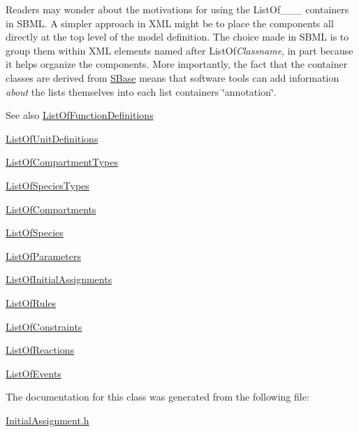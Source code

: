 Readers may wonder about the motivations for using the List\+Of\+\_\+\+\_\+\+\_\+ containers in S\+B\+ML. A simpler approach in X\+ML might be to place the components all directly at the top level of the model definition. The choice made in S\+B\+ML is to group them within X\+ML elements named after List\+Of{\itshape Classname}, in part because it helps organize the components. More importantly, the fact that the container classes are derived from \hyperlink{class_s_base}{S\+Base} means that software tools can add information {\itshape about} the lists themselves into each list container\textquotesingle{}s \char`\"{}annotation\char`\"{}.

\begin{DoxySeeAlso}{See also}
\hyperlink{class_list_of_function_definitions}{List\+Of\+Function\+Definitions} 

\hyperlink{class_list_of_unit_definitions}{List\+Of\+Unit\+Definitions} 

\hyperlink{class_list_of_compartment_types}{List\+Of\+Compartment\+Types} 

\hyperlink{class_list_of_species_types}{List\+Of\+Species\+Types} 

\hyperlink{class_list_of_compartments}{List\+Of\+Compartments} 

\hyperlink{class_list_of_species}{List\+Of\+Species} 

\hyperlink{class_list_of_parameters}{List\+Of\+Parameters} 

\hyperlink{class_list_of_initial_assignments}{List\+Of\+Initial\+Assignments} 

\hyperlink{class_list_of_rules}{List\+Of\+Rules} 

\hyperlink{class_list_of_constraints}{List\+Of\+Constraints} 

\hyperlink{class_list_of_reactions}{List\+Of\+Reactions} 

\hyperlink{class_list_of_events}{List\+Of\+Events} 
\end{DoxySeeAlso}


The documentation for this class was generated from the following file\+:\begin{DoxyCompactItemize}
\item 
\hyperlink{_initial_assignment_8h}{Initial\+Assignment.\+h}\end{DoxyCompactItemize}
